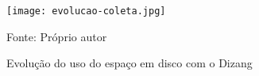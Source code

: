 
\begin{figure}[htb!]
\footnotesize
\caption{Evolução do uso do espaço em disco com o Dizang}
\texttt{[image: evolucao-coleta.jpg]}
\centering
\label{fig:evolucao-coleta}
\begin{center}
Fonte: Próprio autor 
\end{center}
\end{figure}


\begin{comment}
A Figura \ref{fig:memoria_salva}, por sua vez, mostra uma listagem de alguns dos instantâneos de memória salvos pela solução depois que os contêineres são removidos. 
%
Nela pode-se ver que as coletas continuaram no disco da máquina mesmo após a remoção dos contêineres. 
%
Usando o identificador do contêiner e da imagem, consegue-se associar a evidência a sua origem (i.e., a imagem e o contêiner), conforme esperado para uma análise forense.
%
Essa capacidade se mantém após a detecção de uma ameaça, pois nesse caso coletas mais antigas deixam de ser apagadas.
%
Assim, é possível descrever o estado do sistema antes e depois do incidente \cite{Case_Memory_Forensics:2014}, permitindo-se, por exemplo, que ataques de injeção de código em memória sejam analisados.


\begin{figure*}[htb!]
\footnotesize
\caption{Exemplo de lista de instantâneos de memória.}
\fbox{
\texttt{[image: memoria\_salva.jpg]}
}
\centering
\label{fig:memoria_salva}
\end{figure*}

\end{comment}

